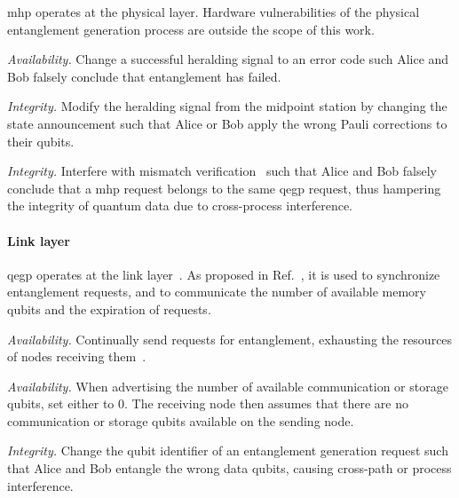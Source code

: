 \acrshort{mhp} operates at the physical layer. Hardware vulnerabilities of the physical entanglement
generation process are outside the scope of this work.

\begin{example}
\textit{Availability.}
Change a successful heralding signal to an error code such Alice and Bob falsely conclude that
entanglement has failed.
\end{example}

\begin{example}
\textit{Integrity.}
Modify the heralding signal from the midpoint station by changing the state announcement such that
Alice or Bob apply the wrong Pauli corrections to their qubits.
\end{example}

\begin{example}
\textit{Integrity.}
Interfere with mismatch verification~\cite{dahlberg_2019_egp, pompili_2022_experimental} such that
Alice and Bob falsely conclude that a \acrshort{mhp} request belongs to the same \acrshort{qegp}
request, thus hampering the integrity of quantum data due to cross-process interference.
\end{example}

\paragraph{Link layer}

\acrshort{qegp} operates at the link layer~\cite{dahlberg_2019_egp}. As proposed in
Ref.~\cite{dahlberg_2019_egp}, it is used to synchronize entanglement requests, and to communicate
the number of available memory qubits and the expiration of requests.

\begin{example}
\textit{Availability.}
Continually send requests for entanglement, exhausting the resources of nodes receiving
them~\cite{kozlowski_2019_towards}.
\end{example}

\begin{example}
\textit{Availability.}
When advertising the number of available communication or storage qubits, set either to 0. The
receiving node then assumes that there are no communication or storage qubits available on the
sending node.
\end{example}

\begin{example}
\textit{Integrity.}
Change the qubit identifier of an entanglement generation request such that Alice and Bob entangle
the wrong data qubits, causing cross-path or process interference.
\end{example}

